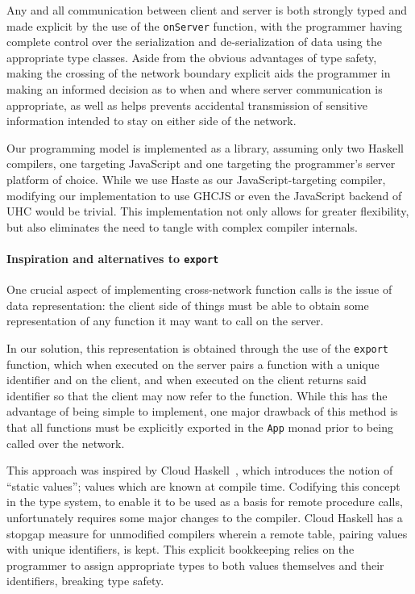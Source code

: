 \documentclass[preprint]{sigplanconf}
\begin{document}
Any and all communication between client and server is both strongly typed
and made explicit by the use of the \lstinline!onServer! function, with the
programmer having complete control over the serialization and de-serialization
of data using the appropriate type classes. Aside from the obvious advantages
of type safety, making the crossing of the network boundary explicit aids the
programmer in making an informed decision as to when and where server
communication is appropriate, as well as helps prevents accidental transmission
of sensitive information intended to stay on either side of the network.

Our programming model is implemented as a library, assuming only two Haskell
compilers, one targeting JavaScript and one targeting the programmer's server
platform of choice. While we use Haste as our JavaScript-targeting compiler,
modifying our implementation to use GHCJS or even the JavaScript backend of UHC
would be trivial. This implementation not only allows for greater flexibility,
but also eliminates the need to tangle with complex compiler internals.

\paragraph{Inspiration and alternatives to \lstinline!export!}
\label{sec:cloudhaskell}
One crucial aspect of implementing cross-network function calls is the issue of
data representation: the client side of things must be able to obtain some
representation of any function it may want to call on the server.

In our solution, this representation is obtained through the use of the \lstinline!export! function, which when executed on the server pairs a function with a
unique identifier and on the client, and when executed on the client returns
said identifier so that the client may now refer to the function. While this
has the advantage of being simple to implement, one major drawback of this
method is that all functions must be explicitly exported in the \lstinline!App!
monad prior to being called over the network.

This approach was inspired by Cloud Haskell\ \cite{cloudhaskell}, which
introduces the notion of ``static values''; values which are known at compile
time. Codifying this concept in the type system, to enable it to be used as a
basis for remote procedure calls, unfortunately requires some major changes to
the compiler. Cloud Haskell has a stopgap measure for unmodified compilers
wherein a remote table, pairing values with unique identifiers, is kept.
This explicit bookkeeping relies on the programmer to assign appropriate types
to both values themselves and their identifiers, breaking type safety.
\end{document}
